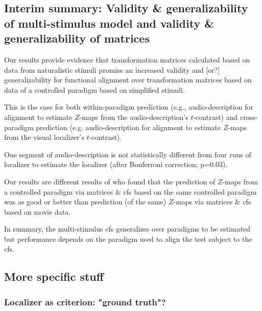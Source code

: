 \subsection{Interim summary: Validity \& generalizability of multi-stimulus
model and validity \& generalizability of matrices}


%
Our results provide evidence that transformation matrices calculated based on
data from naturalistic stimuli promise an increased validity and [or?]
generalizability for functional alignment over transformation matrices based on
data of a controlled paradigm based on simplified stimuli.



%
This is the case for both within-paradigm prediction (e.g., audio-description
for alignment to estimate $Z$-maps from the audio-description's $t$-contrast)
and cross-paradigm prediction (e.g. audio-description for alignment to estimate
$Z$-maps from the visual localizer's $t$-contrast).

%
One segment of audio-description is not statistically different from four
runs of localizer to estimate the localizer (after Bonferroni correction;
p=0.03).



%
Our results are different results of \citet{haxby2011common} who found that the
prediction of $Z$-maps from a controlled paradigm via matrices \& \ac{cfs} based
on the same controlled paradigm was as good or better than prediction (of the
same) $Z$-maps via matrices \& \ac{cfs} based on movie data.

%
In summary, the multi-stimulus \ac{cfs} generalizes over paradigms
to be estimated but performance depends on the paradigm used to align the test
subject to the \ac{cfs}.



\subsection{More specific stuff}

\subsubsection{Localizer as criterion: "ground truth"?}

